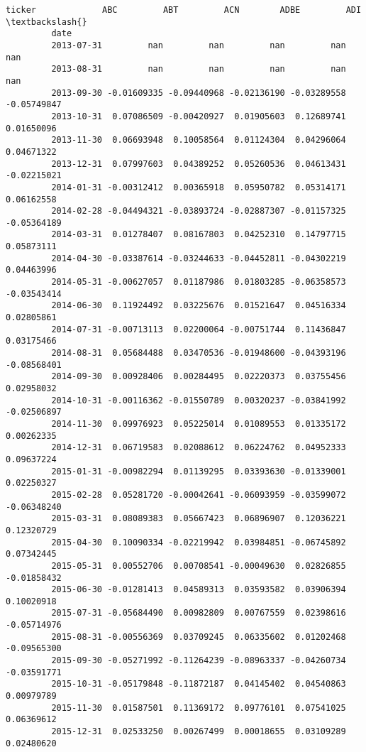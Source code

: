 \documentclass[11pt]{article}
\begin{document}
\begin{Verbatim}[commandchars=\\\{\}]
         ticker             ABC         ABT         ACN        ADBE         ADI  \textbackslash{}
         date                                                                     
         2013-07-31         nan         nan         nan         nan         nan   
         2013-08-31         nan         nan         nan         nan         nan   
         2013-09-30 -0.01609335 -0.09440968 -0.02136190 -0.03289558 -0.05749847   
         2013-10-31  0.07086509 -0.00420927  0.01905603  0.12689741  0.01650096   
         2013-11-30  0.06693948  0.10058564  0.01124304  0.04296064  0.04671322   
         2013-12-31  0.07997603  0.04389252  0.05260536  0.04613431 -0.02215021   
         2014-01-31 -0.00312412  0.00365918  0.05950782  0.05314171  0.06162558   
         2014-02-28 -0.04494321 -0.03893724 -0.02887307 -0.01157325 -0.05364189   
         2014-03-31  0.01278407  0.08167803  0.04252310  0.14797715  0.05873111   
         2014-04-30 -0.03387614 -0.03244633 -0.04452811 -0.04302219  0.04463996   
         2014-05-31 -0.00627057  0.01187986  0.01803285 -0.06358573 -0.03543414   
         2014-06-30  0.11924492  0.03225676  0.01521647  0.04516334  0.02805861   
         2014-07-31 -0.00713113  0.02200064 -0.00751744  0.11436847  0.03175466   
         2014-08-31  0.05684488  0.03470536 -0.01948600 -0.04393196 -0.08568401   
         2014-09-30  0.00928406  0.00284495  0.02220373  0.03755456  0.02958032   
         2014-10-31 -0.00116362 -0.01550789  0.00320237 -0.03841992 -0.02506897   
         2014-11-30  0.09976923  0.05225014  0.01089553  0.01335172  0.00262335   
         2014-12-31  0.06719583  0.02088612  0.06224762  0.04952333  0.09637224   
         2015-01-31 -0.00982294  0.01139295  0.03393630 -0.01339001  0.02250327   
         2015-02-28  0.05281720 -0.00042641 -0.06093959 -0.03599072 -0.06348240   
         2015-03-31  0.08089383  0.05667423  0.06896907  0.12036221  0.12320729   
         2015-04-30  0.10090334 -0.02219942  0.03984851 -0.06745892  0.07342445   
         2015-05-31  0.00552706  0.00708541 -0.00049630  0.02826855 -0.01858432   
         2015-06-30 -0.01281413  0.04589313  0.03593582  0.03906394  0.10020918   
         2015-07-31 -0.05684490  0.00982809  0.00767559  0.02398616 -0.05714976   
         2015-08-31 -0.00556369  0.03709245  0.06335602  0.01202468 -0.09565300   
         2015-09-30 -0.05271992 -0.11264239 -0.08963337 -0.04260734 -0.03591771   
         2015-10-31 -0.05179848 -0.11872187  0.04145402  0.04540863  0.00979789   
         2015-11-30  0.01587501  0.11369172  0.09776101  0.07541025  0.06369612   
         2015-12-31  0.02533250  0.00267499  0.00018655  0.03109289  0.02480620   

\end{Verbatim}
\end{document}
